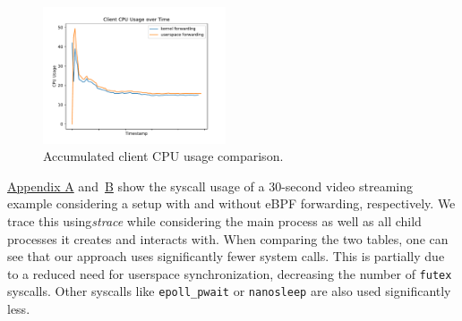\begin{figure}[H]
\begin{minipage}{0.48\textwidth}
    \end{minipage}\hfill
    \begin{minipage}{\textwidth}
        \centering
        \includegraphics[width=0.48\textwidth]{figures/04_testing_and_results/cpu_usage_client_ns.pdf}
        \caption[Client CPU usage comparison]{Accumulated client CPU usage comparison.}\label{fig:cpu-utilization-client}
    \end{minipage}
\end{figure}



\hyperref[chap:appendix-fast-relay]{Appendix A} and~\hyperref[chap:appendix-plain-relay]{B} show 
the syscall usage of a 30-second video streaming example considering a setup with and without eBPF 
forwarding, respectively.
We trace this using\textit{strace} while considering the main process as well as all child processes
it creates and interacts with.
When comparing the two tables, one can see that our approach uses significantly fewer system calls.
This is partially due to a reduced need for userspace synchronization, decreasing the number of \verb|futex| syscalls.
Other syscalls like \verb|epoll_pwait| or \verb|nanosleep| are also used significantly less.

